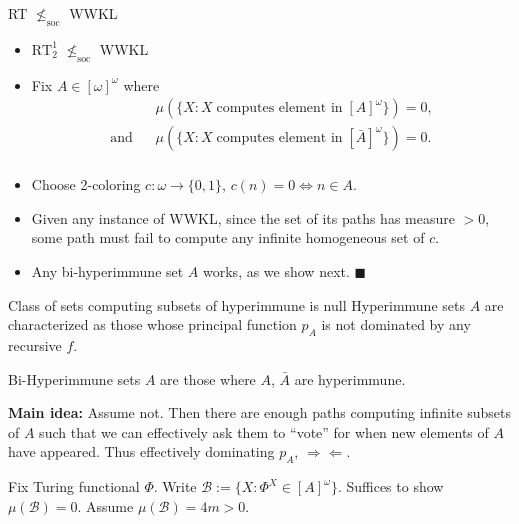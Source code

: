 \begin{frame}{RT $\nleq_{\text{soc}}$ WWKL}
  \begin{itemize}
    \item $\text{RT}_2^1$ $\nleq_{\text{soc}}$ WWKL
    \item Fix $A\in[\omega]^\omega$ where
      \begin{align*}
        &\mu(\{X: X\; \text{computes element in}\; [A]^\omega\}) =0,\\
        \text{and}\;\;\; &\mu(\{X: X\; \text{computes element in}\;
        [\bar{A}]^\omega\}) =0.\\
      \end{align*}
    \item Choose 2-coloring $c:\omega\rightarrow\{0,1\}$, $c(n)=0
      \Leftrightarrow n\in A$.
    \item Given any instance of WWKL, since the set of its paths has
      measure $>0$, some path must fail to compute any infinite
      homogeneous set of $c$. 
    \item Any bi-hyperimmune set $A$ works, as we show next.
    $\blacksquare$
  \end{itemize}
\end{frame}

\begin{frame}{Class of sets computing subsets of hyperimmune is null}
  Hyperimmune sets $A$ are characterized as those whose principal
  function $p_A$ is not dominated by any recursive $f$. \\
  \vspace{1em}

  Bi-Hyperimmune sets $A$ are those where $A$, $\bar{A}$ are hyperimmune.\\
  \vspace{1em}

  \textbf{Main idea:} Assume not. Then there are enough paths computing
  infinite subsets of $A$ such that we can effectively ask them to ``vote''
  for when new elements of $A$ have appeared. Thus effectively dominating
  $p_A$, $\Rightarrow\Leftarrow$.\\
  \vspace{1em}

  Fix Turing functional $\Phi$. Write $\mathcal{B} :=\{X:
  \Phi^X\in[A]^\omega\}$. Suffices to show $\mu(\mathcal{B})=0$. Assume
  $\mu(\mathcal{B})=4m>0$.
\end{frame}

